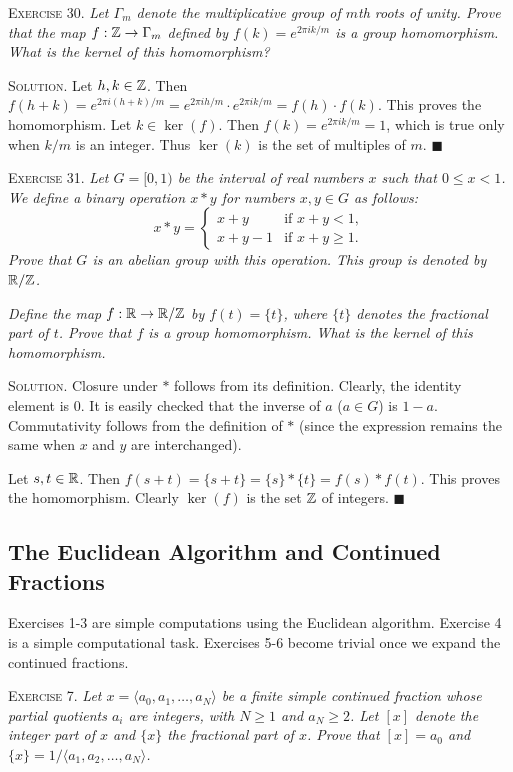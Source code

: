 \documentclass[11pt, leqno]{article}
\newcommand{\done}{\ensuremath{\blacksquare}}
\begin{document}
\textsc{Exercise 30}. \emph{Let $\Gamma_m$ denote the multiplicative group of $m$th roots of unity. Prove that the map $f: \mathbb{Z} \to \Gamma_m$ defined by $f(k) = e^{2\pi i k/m}$ is a group homomorphism. What is the kernel of this homomorphism?}

\textsc{Solution}. Let $h, k \in \mathbb{Z}$. Then $f(h+k) = e^{2\pi i (h+k)/m} = e^{2\pi i h/m}\cdot e^{2\pi i k/m} = f(h)\cdot f(k)$. This proves the homomorphism. Let $k\in \ker(f)$. Then $f(k) = e^{2\pi i k/m} = 1$, which is true only when $k/m$ is an integer. Thus $\ker(k)$ is the set of multiples of $m$. \done

\textsc{Exercise 31}. \emph{Let $G = [0,1)$ be the interval of real numbers $x$ such that $0\leq x < 1$. We define a binary operation $x*y$ for numbers $x,y\in G$ as follows: 
\begin{displaymath}
x*y =
\begin{cases}
  x + y & \text{if } x+y < 1,\\
  x + y - 1 & \text{if } x+y \geq 1.
\end{cases}
\end{displaymath}
Prove that $G$ is an abelian group with this operation. This group is denoted by $\mathbb{R}/\mathbb{Z}$.}

\emph{Define the map $f: \mathbb{R} \to \mathbb{R}/\mathbb{Z}$ by $f(t) = \{t\}$, where $\{t\}$ denotes the fractional part of $t$. Prove that $f$ is a group homomorphism. What is the kernel of this homomorphism.}

\textsc{Solution}. Closure under $*$ follows from its definition. Clearly, the identity element is $0$. It is easily checked that the inverse of $a$ ($a\in G$) is $1-a$. Commutativity follows from the definition of $*$ (since the expression remains the same when $x$ and $y$ are interchanged).

Let $s, t \in \mathbb{R}$. Then $f(s+t) = \{s + t\} = \{s\} * \{t\} = f(s)*f(t)$. This proves the homomorphism. Clearly $\ker(f)$ is the set $\mathbb{Z}$ of integers. \done

\subsection{The Euclidean Algorithm and Continued Fractions}

Exercises 1-3 are simple computations using the Euclidean algorithm. Exercise 4 is a simple computational task. Exercises 5-6 become trivial once we expand the continued fractions.

\textsc{Exercise 7}. \emph{Let $x=\langle a_0, a_1,\ldots,a_N \rangle$ be a finite simple continued fraction whose partial quotients $a_i$ are integers, with $N \geq 1$ and $a_N \geq 2$. Let $[x]$ denote the integer part of $x$ and $\{x\}$ the fractional part of $x$. Prove that $[x]=a_0$ and $\{x\} = 1/\langle a_1, a_2,\ldots,a_N \rangle$.}
\end{document}
